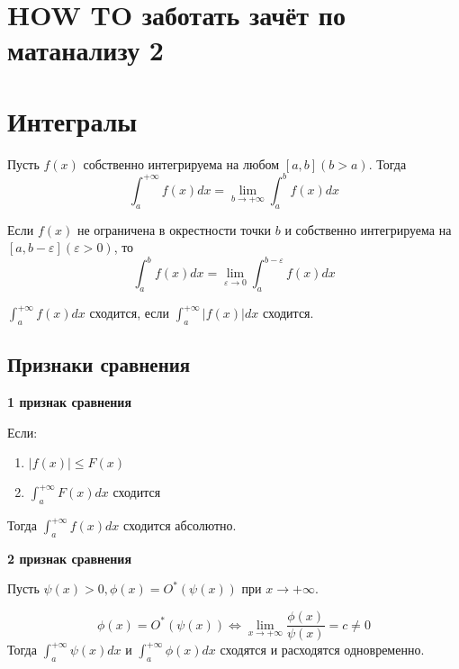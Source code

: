 \documentclass[a4paper]{article}
\author{Васильев Павел}
\begin{document}
\section*{HOW TO заботать зачёт по матанализу 2}

\section*{Интегралы}

\begin{hproof}
Пусть $f(x)$ собственно интегрируема на любом $[a,b] (b>a)$. Тогда
\[
\int_a^{+\infty} f(x)dx = \lim_{b \rightarrow {+\infty}} \int_a^b f(x)dx
\]

\end{hproof}

\begin{hproof}Если $f(x)$ не ограничена в окрестности точки $b$ и собственно интегрируема на $[a,b-\varepsilon] (\varepsilon > 0)$, то 
\[
\int_a^b f(x)dx = \lim_{\varepsilon \rightarrow 0} \int_a^{b-\varepsilon} f(x)dx
\]

\end{hproof}


\begin{hproof}
$\int_a^{+\infty} f(x)dx$ сходится, если $\int_a^{+\infty} |f(x)|dx$ сходится.
\end{hproof}

\subsection*{Признаки сравнения}

\begin{hproof}
\textbf{1 признак сравнения}

Если:
\begin{enumerate}
\item $|f(x)| \leq F(x)$
\item $\int_a^{+\infty} F(x)dx$ сходится
\end{enumerate}

Тогда $\int_a^{+\infty} f(x)dx$ сходится абсолютно.
\end{hproof}

\begin{hproof}
\textbf{2 признак сравнения}

Пусть $\psi(x) > 0, \phi(x) = O^*(\psi(x))$ при $x \rightarrow +\infty$. 

\[\phi(x) = O^*(\psi(x)) \Leftrightarrow \lim_{x \rightarrow {+\infty}} \frac{\phi(x)}{\psi(x)} = c \neq 0\]
Тогда $\int_a^{+\infty} \psi(x) dx$ и $\int_a^{+\infty} \phi(x)dx$ сходятся и расходятся одновременно.

\end{hproof}
\end{document}
